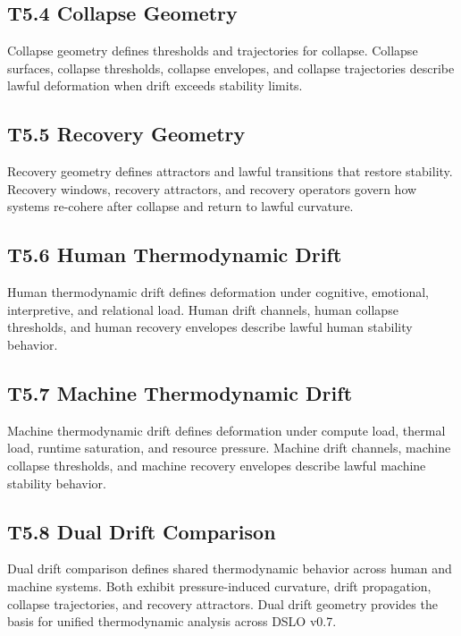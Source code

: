 \subsection{T5.4 Collapse Geometry}
Collapse geometry defines thresholds and trajectories for collapse. Collapse
surfaces, collapse thresholds, collapse envelopes, and collapse trajectories
describe lawful deformation when drift exceeds stability limits.

\subsection{T5.5 Recovery Geometry}
Recovery geometry defines attractors and lawful transitions that restore
stability. Recovery windows, recovery attractors, and recovery operators govern
how systems re-cohere after collapse and return to lawful curvature.

\subsection{T5.6 Human Thermodynamic Drift}
Human thermodynamic drift defines deformation under cognitive, emotional,
interpretive, and relational load. Human drift channels, human collapse
thresholds, and human recovery envelopes describe lawful human stability
behavior.

\subsection{T5.7 Machine Thermodynamic Drift}
Machine thermodynamic drift defines deformation under compute load, thermal
load, runtime saturation, and resource pressure. Machine drift channels,
machine collapse thresholds, and machine recovery envelopes describe lawful
machine stability behavior.

\subsection{T5.8 Dual Drift Comparison}
Dual drift comparison defines shared thermodynamic behavior across human and
machine systems. Both exhibit pressure-induced curvature, drift propagation,
collapse trajectories, and recovery attractors. Dual drift geometry provides the
basis for unified thermodynamic analysis across DSLO v0.7.
